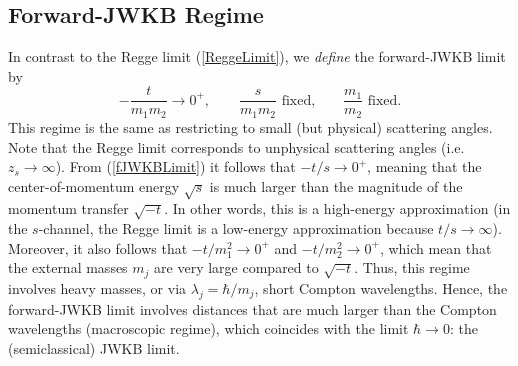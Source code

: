 \subsection{Forward-JWKB Regime}
In contrast to the Regge limit (\ref{ReggeLimit}), we \textit{define} the forward-JWKB limit by
\begin{equation}
	{-\frac{t}{m_{1} m_{2}}} \rightarrow 0^{+}, \qquad \frac{s}{m_{1} m_{2}} \text{ fixed,} \qquad \frac{m_{1}}{m_{2}} \text{ fixed.} \label{fJWKBLimit}
\end{equation}
This regime is the same as restricting to small (but physical) scattering angles. Note that the Regge limit corresponds to unphysical scattering angles (i.e. $z_{s} \rightarrow \infty$). From (\ref{fJWKBLimit}) it follows that $-t/s \rightarrow 0^{+}$, meaning that the center-of-momentum energy $\sqrt{s}$ is much larger than the magnitude of the momentum transfer $\sqrt{-t}$. In other words, this is a high-energy approximation (in the $s$-channel, the Regge limit is a low-energy approximation because $t/s \rightarrow \infty$). Moreover, it also follows that $-t/m_{1}^{2} \rightarrow 0^{+}$ and $-t/m_{2}^{2} \rightarrow 0^{+}$, which mean that the external masses $m_{j}$ are very large compared to $\sqrt{-t}$. Thus, this regime involves heavy masses, or via $\lambda_{j} = \hbar / m_{j}$, short Compton wavelengths. Hence, the forward-JWKB limit involves distances that are much larger than the Compton wavelengths (macroscopic regime), which coincides with the limit $\hbar \rightarrow 0$: the (semiclassical) JWKB limit.

